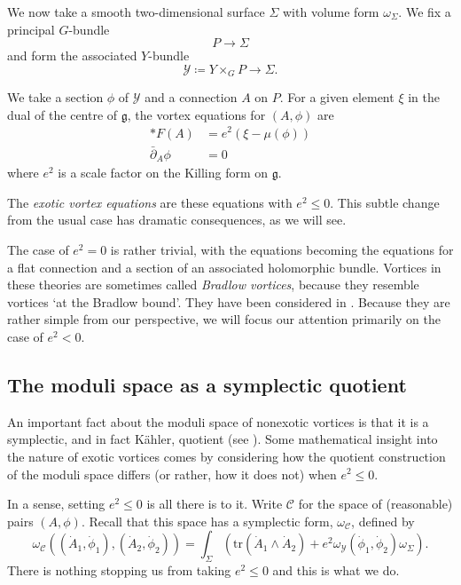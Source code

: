 \documentclass[10pt]{article}
\newcommand{\mc}[1]{\mathcal{#1}}
\newcommand{\db}{\bar{\partial}}
\theoremstyle{definition}
\begin{document}
We now take a smooth two-dimensional surface \(\Sigma\) with volume form \(\omega_\Sigma\). We fix a principal \(G\)-bundle 
\[
P \to \Sigma
\]
and form the associated \(Y\)-bundle
\[
\mc{Y} \coloneqq Y \times_G P \to \Sigma \text{.}
\]

We take a section \(\phi\) of \(\mc{Y}\) and a connection \(A\) on \(P\). For a given element \(\xi\) in the dual of the centre of \(\mathfrak{g}\), the vortex equations for \((A, \phi)\) are
\begin{align*}
*F(A) &= e^2(\xi - \mu(\phi)) \\
\db_A \phi &=0	
\end{align*}
where \(e^2\) is a scale factor on the Killing form on \(\mathfrak{g}\).

The \emph{exotic vortex equations} are these equations with \(e^2 \leq 0\). This subtle change from the usual case has dramatic consequences, as we will see. 

The case of \(e^2=0\) is rather trivial, with the equations becoming the equations for a flat connection and a section of an associated holomorphic bundle. Vortices in these theories are sometimes called \emph{Bradlow vortices}, because they resemble vortices `at the Bradlow bound'. They have been considered in \cite{gudnasonSE}. Because they are rather simple from our perspective, we will focus our attention primarily on the case of \(e^2 < 0\).



\subsection{The moduli space as a symplectic quotient}

An important fact about the moduli space of nonexotic vortices is that it is a symplectic, and in fact K\"ahler, quotient (see \cite{garciapradaDEP}). Some mathematical insight into the nature of exotic vortices comes by considering how the quotient construction of the moduli space differs (or rather, how it does not) when \(e^2 \leq 0\). 

In a sense, setting \(e^2 \leq 0\) is all there is to it. Write \(\mc{C}\) for the space of (reasonable) pairs \((A, \phi)\). Recall that this space has a symplectic form, \(\omega_\mc{C}\), defined by
\[
\omega_\mc{C} ((\dot{A}_1, \dot{\phi}_1), (\dot{A}_2, \dot{\phi}_2)) = \int_\Sigma \left( \text{tr} \left( \dot{A}_1 \wedge \dot{A}_2 \right) + e^2 \omega_\mc{Y} (\dot{\phi}_1, \dot{\phi}_2) \omega_\Sigma  \right)\text{.}
\]
There is nothing stopping us from taking \(e^2 \leq 0\) and this is what we do.
\end{document}
